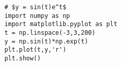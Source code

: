 \begin{verbatim}
    # $y = sin(t)e^t$
    import numpy as np
    import matplotlib.pyplot as plt 
    t = np.linspace(-3,3,200)
    y = np.sin(t)*np.exp(t)
    plt.plot(t,y,'r')
    plt.show()
\end{verbatim}